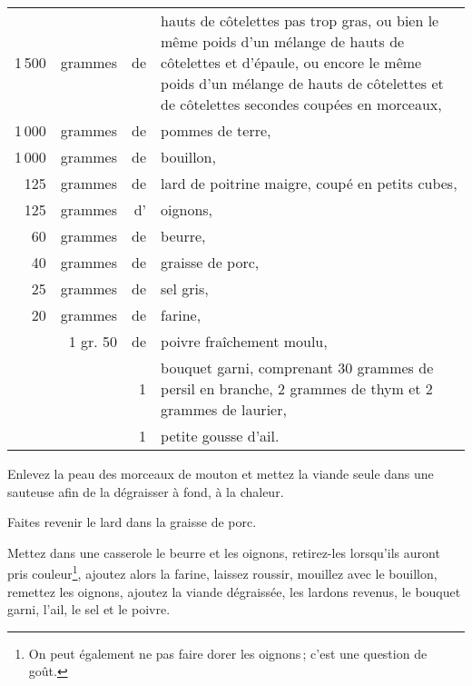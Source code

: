 \footnotesize
\begin{longtable}{rrrp{16em}}
  1 500 & grammes & de & hauts de côtelettes pas trop gras, ou bien le même poids
                         d'un mélange de hauts de côtelettes et d'épaule, ou encore
                         le même poids d'un mélange de hauts de côtelettes et de
                         côtelettes secondes coupées en morceaux,                                         \\
  1 000 & grammes & de & pommes de terre,                                                                 \\
  1 000 & grammes & de & bouillon,                                                                        \\
    125 & grammes & de & lard de poitrine maigre, coupé en petits cubes,                                  \\
    125 & grammes & d’ & oignons,                                                                         \\
     60 & grammes & de & beurre,                                                                          \\
     40 & grammes & de & graisse de porc,                                                                 \\
     25 & grammes & de & sel gris,                                                                        \\
     20 & grammes & de & farine,                                                                          \\
        & 1 gr. 50& de & poivre fraîchement moulu,                                                        \\
        &         &  1 & bouquet garni, comprenant 30 grammes de persil en branche,
                         2 grammes de thym et 2 grammes de laurier,                                       \\
        &         &  1 & petite gousse d'ail.                                                             \\
\end{longtable}
\normalsize

Enlevez la peau des morceaux de mouton et mettez la viande seule dans une
sauteuse afin de la dégraisser à fond, à la chaleur.

Faites revenir le lard dans la graisse de porc.

Mettez dans une casserole le beurre et les oignons, retirez-les lorsqu'ils
auront pris couleur\footnote{On peut également ne pas faire dorer les oignons ;
c'est une question de goût.}, ajoutez alors la farine, laissez roussir,
mouillez avec le bouillon, remettez les oignons, ajoutez la viande dégraissée,
les lardons revenus, le bouquet garni, l'ail, le sel et le poivre.


